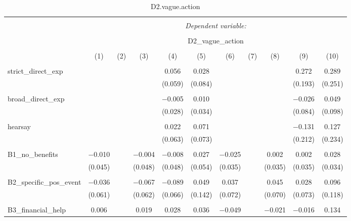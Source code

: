 
\begin{table}[H] \centering 
  \caption{D2.vague.action} 
  \label{} 
\tiny 
\begin{tabular}{@{\extracolsep{4pt}}lcccccccccc} 
\\[-1.8ex]\hline 
\hline \\[-1.8ex] 
 & \multicolumn{10}{c}{\textit{Dependent variable:}} \\ 
\cline{2-11} 
\\[-1.8ex] & \multicolumn{10}{c}{D2\_vague\_action} \\ 
\\[-1.8ex] & (1) & (2) & (3) & (4) & (5) & (6) & (7) & (8) & (9) & (10)\\ 
\hline \\[-1.8ex] 
 strict\_direct\_exp &  &  &  & 0.056 & 0.028 &  &  &  & 0.272 & 0.289 \\ 
  &  &  &  & (0.059) & (0.084) &  &  &  & (0.193) & (0.251) \\ 
  & & & & & & & & & & \\ 
 broad\_direct\_exp &  &  &  & $-$0.005 & 0.010 &  &  &  & $-$0.026 & 0.049 \\ 
  &  &  &  & (0.028) & (0.034) &  &  &  & (0.084) & (0.098) \\ 
  & & & & & & & & & & \\ 
 hearsay &  &  &  & 0.022 & 0.071 &  &  &  & $-$0.131 & 0.127 \\ 
  &  &  &  & (0.063) & (0.073) &  &  &  & (0.212) & (0.234) \\ 
  & & & & & & & & & & \\ 
 B1\_no\_benefits & $-$0.010 &  & $-$0.004 & $-$0.008 & 0.027 & $-$0.025 &  & 0.002 & 0.002 & 0.028 \\ 
  & (0.045) &  & (0.048) & (0.048) & (0.054) & (0.035) &  & (0.035) & (0.035) & (0.034) \\ 
  & & & & & & & & & & \\ 
 B2\_specific\_pos\_event & $-$0.036 &  & $-$0.067 & $-$0.089 & 0.049 & 0.037 &  & 0.045 & 0.028 & 0.096 \\ 
  & (0.061) &  & (0.062) & (0.066) & (0.142) & (0.072) &  & (0.070) & (0.073) & (0.118) \\ 
  & & & & & & & & & & \\ 
 B3\_financial\_help & 0.006 &  & 0.019 & 0.028 & 0.036 & $-$0.049 &  & $-$0.021 & $-$0.016 & 0.134 \\ 

\end{tabular}
\end{table}
